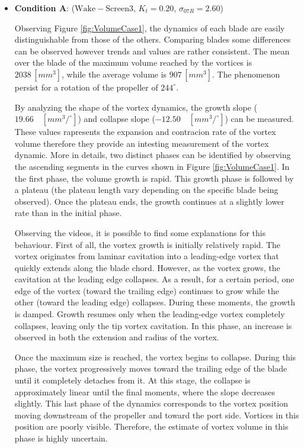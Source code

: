 \begin{itemize}
    \item \textbf{Condition A}: ($\mathrm{Wake-Screen3}$, $K_t = 0.20$, $\sigma_{07R} = 2.60$)
    
    Observing Figure \ref{fig:VolumeCase1}, the dynamics of each blade are easily distinguishable from those of the others. 
    Comparing blades some differences can be observed however trends and values are rather consistent.
    The mean over the blade of the maximum volume reached by the vortices is $2038 \,[mm^3]$, while the average volume is $907 \,[mm^3]$.  
    The phenomenon persist for a rotation of the propeller of $244 ^{\circ}$.  
    
    By analyzing the shape of the vortex dynamics, the growth slope ($19.66 \quad [mm^3/^{\circ}]$) and collapse slope ($-12.50 \quad [mm^3/^{\circ}]$) can be measured. 
    These values rapresents the expansion and contracion rate of the vortex volume therefore they provide an intesting measurement of the vortex dynamic.
    More in details, two distinct phases can be identified by observing the ascending segments in the curves shown in Figure \ref{fig:VolumeCase1}. In the first phase, the volume growth is rapid. This growth phase is followed by a plateau (the plateau length vary depending on the specific blade being observed). Once the plateau ends, the growth continues at a slightly lower rate than in the initial phase.

    Observing the videos, it is possible to find some explanations for this behaviour. 
    First of all, the vortex growth is initially relatively rapid. The vortex originates from laminar cavitation into a leading-edge vortex that quickly extends along the blade chord. However, as the vortex grows, the cavitation at the leading edge collapses. 
    As a result, for a certain period, one edge of the vortex (toward the trailing edge) continues to grow while the other (toward the leading edge) collapses. During these moments, the growth is damped. 
    Growth resumes only when the leading-edge vortex completely collapses, leaving only the tip vortex cavitation. In this phase, an increase is observed in both the extension and radius of the vortex.  
    
    Once the maximum size is reached, the vortex begins to collapse. During this phase, the vortex progressively moves toward the trailing edge of the blade until it completely detaches from it. At this stage, the collapse is approximately linear until the final moments, where the slope decreases slightly.  
    This last phase of the dynamics corresponds to the vortex position moving downstream of the propeller and toward the port side. Vortices in this position are poorly visible. Therefore, the estimate of vortex volume in this phase is highly uncertain.  
    

\end{itemize}
